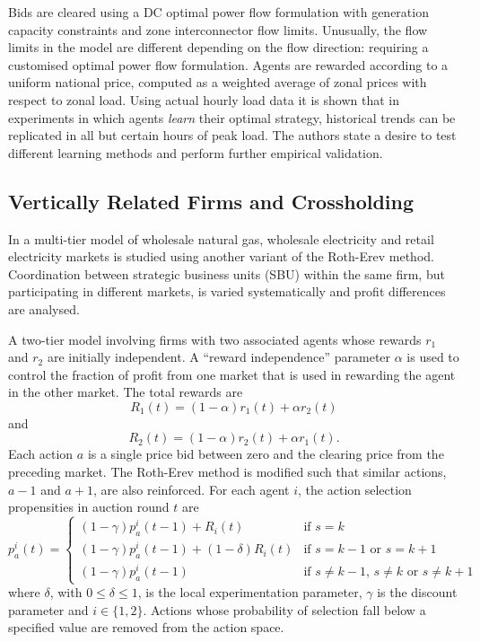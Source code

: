 
Bids are cleared using a DC optimal power flow formulation with generation
capacity constraints and zone interconnector flow limits. Unusually, the flow
limits in the model are different depending on the flow direction: requiring a
customised optimal power flow formulation. Agents are rewarded according to a
uniform national price, computed as a weighted average of zonal prices with
respect to zonal load.  Using actual hourly load data it is shown that in
experiments in which agents \textit{learn} their optimal strategy, historical
trends can be replicated in all but certain hours of peak load.  The authors state a desire
to test different learning methods and perform further empirical validation.

\subsection{Vertically Related Firms and Crossholding}
In  a multi-tier model of wholesale natural gas, wholesale
electricity and retail electricity markets is studied using another variant of
the Roth-Erev method.  Coordination between strategic business units (SBU)
within the same firm, but participating in different markets, is varied
systematically and profit differences are analysed.

A two-tier model involving firms with two associated agents whose rewards $r_1$
and $r_2$ are initially independent.  A ``reward independence'' parameter
$\alpha$ is used to control the fraction of profit from one market that is used
in rewarding the agent in the other market. The total rewards are
\begin{equation}
R_1(t) = (1-\alpha)r_1(t) + \alpha r_2(t)
\end{equation}
and
\begin{equation}
R_2(t) = (1-\alpha)r_2(t) + \alpha r_1(t).
\end{equation}
Each action $a$ is a single price bid between zero and the clearing price from
the preceding market.  The Roth-Erev method is modified such that similar
actions, $a-1$ and $a+1$, are also reinforced.  For each agent $i$, the
action selection propensities in auction round $t$ are
\begin{equation}
p^i_a(t) = \begin{cases}
(1-\gamma)p^i_a(t-1) + R_i(t)& \text{if $s=k$}\\
(1-\gamma)p^i_a(t-1) + (1-\delta)R_i(t)& \text{if $s=k-1$ or $s=k+1$}\\
(1-\gamma)p^i_a(t-1)& \text{if $s\neq k-1$, $s\neq k$ or $s\neq k+1$}
\end{cases}
\end{equation}
where $\delta$, with $0\leq \delta \leq 1$, is the local experimentation
parameter, $\gamma$ is the discount parameter and $i\in \lbrace 1,2 \rbrace$.
Actions whose probability of selection fall below a specified value are
removed from the action space.


